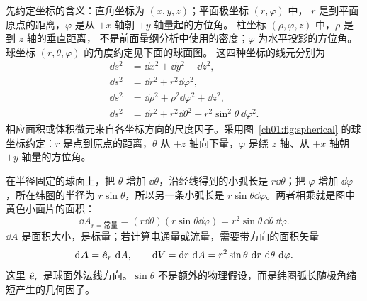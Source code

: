 先约定坐标的含义：直角坐标为 $(x,y,z)$；平面极坐标 $(r,\varphi)$ 中，
$r$ 是到平面原点的距离，$\varphi$ 是从 $+x$ 轴朝 $+y$ 轴量起的方位角。
柱坐标 $(\rho,\varphi,z)$ 中，$\rho$ 是到 $z$ 轴的垂直距离，
不是前面量纲分析中使用的密度；$\varphi$ 为水平投影的方位角。
球坐标 $(r,\theta,\varphi)$ 的角度约定见下面的球面图。
这四种坐标的线元分别为
\begin{align}
 \dd s^2&=\dd x^2+\dd y^2+\dd z^2,\\
 \dd s^2&=\dd r^2+r^2\dd\varphi^2,\\
 \dd s^2&=\dd \rho^2+\rho^2\dd\varphi^2+\dd z^2,\\
 \dd s^2&=\dd r^2+r^2\dd\theta^2+r^2\sin^2\theta\,\dd\varphi^2.
\end{align}
相应面积或体积微元来自各坐标方向的尺度因子。采用图~\ref{ch01:fig:spherical} 的球坐标约定：$r$ 是点到原点的距离，$\theta$ 从 $+z$ 轴向下量，$\varphi$ 是绕 $z$ 轴、从 $+x$ 轴朝 $+y$ 轴量的方位角。

在半径固定的球面上，把 $\theta$ 增加 $\dd\theta$，沿经线得到的小弧长是 $r\dd\theta$；把 $\varphi$ 增加 $\dd\varphi$，所在纬圈的半径为 $r\sin\theta$，所以另一条小弧长是 $r\sin\theta\dd\varphi$。两者相乘就是图中黄色小面片的面积：
\begin{equation}
 \boxed{\dd A_{r=\text{常量}}
 =(r\dd\theta)(r\sin\theta\dd\varphi)
 =r^2\sin\theta\,\dd\theta\,\dd\varphi}.
\end{equation}
$\dd A$ 是面积大小，是标量；若计算电通量或流量，需要带方向的面积矢量
\begin{equation}
 \dd\vect A=\uvec e_r\,\dd A,
 \qquad
 \dd V=\dd r\,\dd A
 =r^2\sin\theta\,\dd r\,\dd\theta\,\dd\varphi.
\end{equation}
这里 $\hat{\bm{e}}_r$ 是球面外法线方向。$\sin\theta$ 不是额外的物理假设，而是纬圈弧长随极角缩短产生的几何因子。

